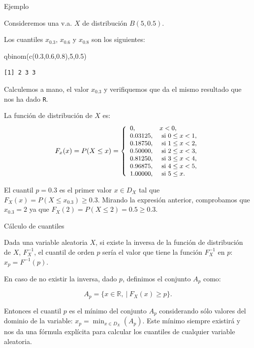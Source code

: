 \documentclass[
  letterpaper,
  DIV=11,
  numbers=noendperiod]{scrreprt}
\newenvironment{Shaded}{\begin{snugshade}}{\end{snugshade}}
\newcommand{\DecValTok}[1]{\textcolor[rgb]{0.68,0.00,0.00}{#1}}
\newcommand{\FloatTok}[1]{\textcolor[rgb]{0.68,0.00,0.00}{#1}}
\newcommand{\FunctionTok}[1]{\textcolor[rgb]{0.28,0.35,0.67}{#1}}
\newcommand{\NormalTok}[1]{\textcolor[rgb]{0.00,0.23,0.31}{#1}}
\begin{document}
\begin{Ejemplo}{Ejemplo}{}

Consideremos una v.a. \(X\) de distribución \(B(5,0.5)\).

Los cuantiles \(x_{0.3}\), \(x_{0.6}\) y \(x_{0.8}\) son los siguientes:

\begin{Shaded}
\begin{Highlighting}[]
\FunctionTok{qbinom}\NormalTok{(}\FunctionTok{c}\NormalTok{(}\FloatTok{0.3}\NormalTok{,}\FloatTok{0.6}\NormalTok{,}\FloatTok{0.8}\NormalTok{),}\DecValTok{5}\NormalTok{,}\FloatTok{0.5}\NormalTok{)}
\end{Highlighting}
\end{Shaded}

\begin{verbatim}
[1] 2 3 3
\end{verbatim}

Calculemos a mano, el valor \(x_{0.3}\) y verifiquemos que da el mismo
resultado que nos ha dado \texttt{R}.

La función de distribución de \(X\) es: \[
\small{
F_x(x)=P(X\leq x)=
\left\{
\begin{array}{ll}
0, & x< 0, \\
0.03125, & \mbox{ si } 0 \leq x< 1, \\
0.18750, & \mbox{ si } 1 \leq x< 2, \\
0.50000, & \mbox{ si } 2 \leq x< 3, \\
0.81250, & \mbox{ si } 3 \leq x< 4, \\
0.96875, & \mbox{ si } 4 \leq x< 5, \\
1.00000, & \mbox{ si } 5\leq x. \\
\end{array}
\right.}
\]

El cuantil \(p=0.3\) es el primer valor \(x\in D_X\) tal que
\(F_X(x)=P(X\leq x_{0.3})\geq 0.3\). Mirando la expresión anterior,
comprobamos que \(x_{0.3}=2\) ya que \(F_X(2)=P(X\leq 2)=0.5 \geq 0.3\).

\end{Ejemplo}

\begin{Proposicion}{Cálculo de cuantiles}{}

Dada una variable aleatoria \(X\), si existe la inversa de la función de
distribución de \(X\), \(F_X^{-1}\), el cuantil de orden \(p\) sería el
valor que tiene la función \(F_X^{-1}\) en \(p\): \(x_p=F^{-1}(p)\).

En caso de no existir la inversa, dado \(p\), definimos el conjunto
\(A_p\) como:

\[
A_p =\{x\in\mathbb{R},\ |\ F_X(x)\geq p\}.
\]

Entonces el cuantil \(p\) es el mínimo del conjunto \(A_p\) considerando
sólo valores del dominio de la variable:
\(x_p =\displaystyle\min_{x\in D_X}(A_p)\). Este mínimo siempre existirá
y nos da una fórmula explícita para calcular los cuantiles de cualquier
variable aleatoria.

\end{Proposicion}
\end{document}
